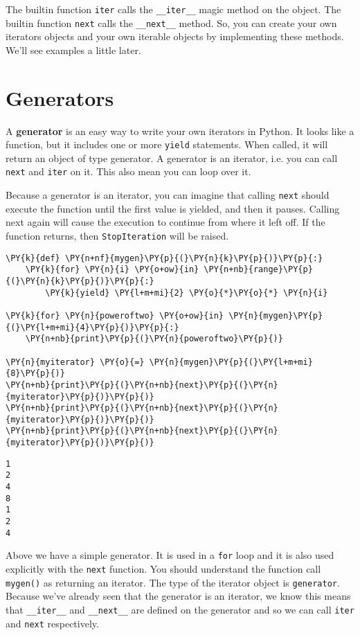 The builtin function \texttt{iter} calls the \texttt{\_\_iter\_\_} magic method on the object.  The builtin function \texttt{next} calls the \texttt{\_\_next\_\_} method.  So, you can create your own iterators objects and your own iterable objects by implementing these methods.  We’ll see examples a little later.

\section{Generators}


A \textbf{generator} is an easy way to write your own iterators in Python.  It looks like a function, but it includes one or more \texttt{yield} statements.  When called, it will return an object of type generator.  A generator is  an iterator, i.e. you can call \texttt{next} and \texttt{iter} on it.  This also mean you can loop over it.


Because a generator is an iterator, you can imagine that calling \texttt{next} should execute the function until the first value is yielded, and then it pauses.  Calling next again will cause the execution to continue from where it left off.  If the function returns, then \texttt{StopIteration} will be raised.  


\begin{Verbatim}[commandchars=\\\{\}]
\PY{k}{def} \PY{n+nf}{mygen}\PY{p}{(}\PY{n}{k}\PY{p}{)}\PY{p}{:}
    \PY{k}{for} \PY{n}{i} \PY{o+ow}{in} \PY{n+nb}{range}\PY{p}{(}\PY{n}{k}\PY{p}{)}\PY{p}{:}
        \PY{k}{yield} \PY{l+m+mi}{2} \PY{o}{*}\PY{o}{*} \PY{n}{i}

\PY{k}{for} \PY{n}{poweroftwo} \PY{o+ow}{in} \PY{n}{mygen}\PY{p}{(}\PY{l+m+mi}{4}\PY{p}{)}\PY{p}{:}
    \PY{n+nb}{print}\PY{p}{(}\PY{n}{poweroftwo}\PY{p}{)}

\PY{n}{myiterator} \PY{o}{=} \PY{n}{mygen}\PY{p}{(}\PY{l+m+mi}{8}\PY{p}{)}
\PY{n+nb}{print}\PY{p}{(}\PY{n+nb}{next}\PY{p}{(}\PY{n}{myiterator}\PY{p}{)}\PY{p}{)}
\PY{n+nb}{print}\PY{p}{(}\PY{n+nb}{next}\PY{p}{(}\PY{n}{myiterator}\PY{p}{)}\PY{p}{)}
\PY{n+nb}{print}\PY{p}{(}\PY{n+nb}{next}\PY{p}{(}\PY{n}{myiterator}\PY{p}{)}\PY{p}{)}
\end{Verbatim}

\begin{Verbatim}
1
2
4
8
1
2
4

\end{Verbatim}


Above we have a simple generator.  It is used in a \texttt{for} loop and it is also used explicitly with the \texttt{next} function.  You should understand the function call \texttt{mygen()} as returning an iterator.  The type of the iterator object is \texttt{generator}.  Because we’ve already seen that the generator is an iterator, we know this means that \texttt{\_\_iter\_\_} and \texttt{\_\_next\_\_} are defined on the generator and so we can call \texttt{iter} and \texttt{next} respectively.

